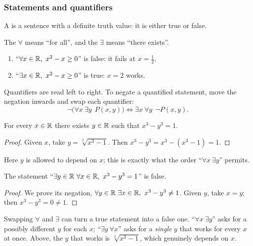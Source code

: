 \subsubsection*{Statements and quantifiers}
\begin{defi}
  A  is a sentence with a definite truth value: it is either
  true or false.
\end{defi}

The  $\forall$ means ``for all'', and the
 $\exists$ means ``there exists''.

\begin{eg}\leavevmode
  \begin{enumerate}
    \item ``$\forall x \in \mathbb{R},\ x^2 - x \geq 0$'' is false: it fails at
      $x = \frac{1}{2}$.
    \item ``$\exists x \in \mathbb{R},\ x^2 - x \geq 0$'' is true: $x = 2$ works.
  \end{enumerate}
\end{eg}

\begin{notation}
  Quantifiers are read left to right. To negate a quantified statement, move
  the negation inwards and swap each quantifier:
  \[
    \neg\bigl(\forall x\ \exists y\ \ P(x, y)\bigr) \iff \exists x\ \forall y\ \ \neg P(x, y).
  \]
\end{notation}

\begin{prop}
  For every $x \in \mathbb{R}$ there exists $y \in \mathbb{R}$ such that $x^3 - y^3 = 1$.
\end{prop}

\begin{proof}
  Given $x$, take $y = \sqrt[3]{x^3 - 1}$. Then $x^3 - y^3 = x^3 - (x^3 - 1) = 1$.
\end{proof}
Here $y$ is allowed to depend on $x$; this is exactly what the order
``$\forall x\ \exists y$'' permits.

\begin{prop}
  The statement ``$\exists y \in \mathbb{R}\ \forall x \in \mathbb{R},\ x^3 - y^3 = 1$'' is
  false.
\end{prop}

\begin{proof}
  We prove its negation, $\forall y \in \mathbb{R}\ \exists x \in \mathbb{R},\ x^3 - y^3 \neq 1$.
  Given $y$, take $x = y$; then $x^3 - y^3 = 0 \neq 1$.
\end{proof}

\begin{warning}
  Swapping $\forall$ and $\exists$ can turn a true statement into a false
  one. ``$\forall x\ \exists y$'' asks for a possibly different $y$ for each
  $x$; ``$\exists y\ \forall x$'' asks for a \emph{single} $y$ that works for
  every $x$ at once. Above, the $y$ that works is $\sqrt[3]{x^3 - 1}$, which
  genuinely depends on $x$.
\end{warning}
